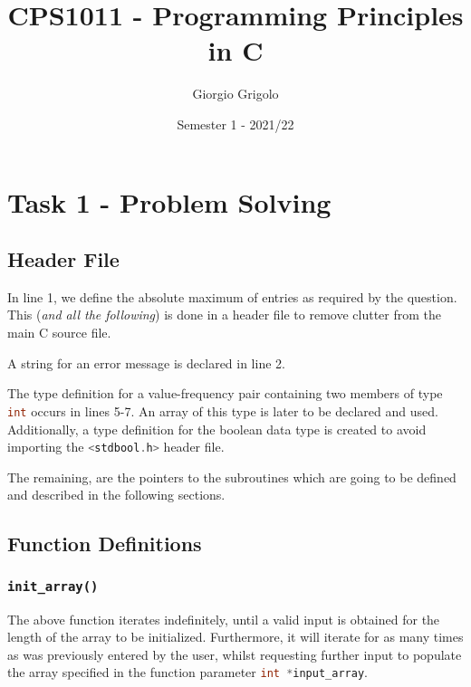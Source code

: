 \documentclass{article}
\title{CPS1011 - Programming Principles in C}
\author{Giorgio Grigolo}
\date{Semester 1 - 2021/22}
\newcommand{\code}[1]{\lstinline[language=C]!#1!}
\begin{document}
\maketitle
\tableofcontents
\newpage

\section{Task 1 - Problem Solving}

\subsection{Header File}



In line 1, we define the absolute maximum of entries as required by the question. This
(\textit{and all the following}) is done
in a header file to remove clutter from the main C source file. 

A string for an error message is declared in line 2.

The type definition for a value-frequency pair containing two members of type \code{int} occurs 
in lines 5-7. An array of this type is later to be declared and used. Additionally, a type
definition for the boolean data type is created to avoid importing the \code{<stdbool.h>} header 
file.

The remaining, are the pointers to the subroutines which are going to be defined and described in
the following sections.

\newpage

\subsection{Function Definitions}

\subsubsection{\texttt{init\_array()}}
	


The above function iterates indefinitely, until a valid input is obtained for the length of the
array to be initialized. Furthermore, it will iterate for as many times as was previously entered
by the user, whilst requesting further input to populate the array specified in the function
parameter \code{int *input_array}.
\end{document}
